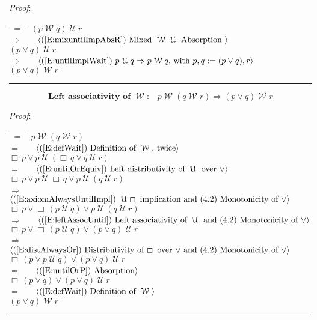 \documentclass[12pt, fleqn, leqno]{article}
\newcommand{\lgap}{2pt}                             %
\newcommand{\mymathindent}{24pt}                    %
\newcommand{\impl}{\ensuremath{\Rightarrow}}        %
\newcommand{\Until}{\;\mathcal{U}\;}
\newcommand{\Wait}{\;\mathcal{W}\;}
\newcommand{\Always}{\Box\,}
\newcommand{\myqed}{\rule[-.23ex]{1.2ex}{2.0ex}}
\newcommand{\myqedtab}{\hspace{384pt}}              %
\newcommand{\Gll} {\langle}                         %
\newcommand{\Ggg} {\rangle}                         %
\newcommand{\Hint}[1]     {\ \ \ $\Gll              \mbox{#1} \Ggg$ }   %
\begin{document}
\emph{Proof}: 
\begin{tabbing}
\hspace{\mymathindent} \= $= \;$ \= \myqedtab \= \kill
  \> \>   $(p\Wait q)\Until r$\\[\lgap]
  \> $\impl$  \>  \Hint{(\ref{E:mixuntilImpAbsR}) Mixed $\Wait\Until$ Absorption }\\[\lgap]
  \> \>   $(p \lor q) \Until r$\\[\lgap]
  \> $\impl$  \>  \Hint{(\ref{E:untilImplWait}) $p\Until q\impl p\Wait q$, with $p,q := (p\lor q), r$}\\[\lgap]
  \> \>   $(p \lor q) \Wait r$ \quad \myqed
\end{tabbing}

\begin{equation}\label{E:leftAssocWait}
\textbf{Left associativity of $\Wait$:}\quad p \Wait (q \Wait r) \impl (p \lor q) \Wait r
\end{equation}

\emph{Proof}:
\begin{tabbing}
\hspace{\mymathindent} \= $= \;$ \= \myqedtab \= \kill
\> \>   $p \Wait (q \Wait r)$\\[\lgap]
\> $=$ \> \Hint{(\ref{E:defWait}) Definition of $\Wait$, twice} \\[\lgap]
\> \>   $\Always p\lor p\Until (\Always q\lor q \Until r)$\\[\lgap]
\> $=$  \>  \Hint{(\ref{E:untilOrEquiv}) Left distributivity of $\Until$ over $\lor$}\\[\lgap]
\> \>   $\Always p\lor p\Until \Always q\lor p\Until (q \Until r)$\\[\lgap]
\> $\impl$ \> \Hint{(\ref{E:axiomAlwaysUntilImpl}) $\Until\Always$ implication and (4.2) Monotonicity of $\lor$}\\[\lgap]
\> \>   $\Always p\lor \Always (p\Until q)\lor p\Until (q \Until r)$\\[\lgap]
\> $\impl$ \> \Hint{(\ref{E:leftAssocUntil}) Left associativity of $\Until$ and (4.2) Monotonicity of $\lor$} \\[\lgap]
\> \>   $\Always p\lor \Always (p\Until q)\lor (p\lor q) \Until r$\\[\lgap]
  \> $\impl$  \>  \Hint{(\ref{E:distAlwaysOr}) Distributivity of $\Always$ over $\lor$ and (4.2) Monotonicity of $\lor$}\\[\lgap]
\> \>   $\Always (p\lor p\Until q)\lor (p\lor q) \Until r$\\[\lgap]
\> $=$ \> \Hint{(\ref{E:untilOrP}) Absorption} \\[\lgap]
\> \>   $\Always (p\lor q)\lor (p\lor q) \Until r$\\[\lgap]
\> $=$ \> \Hint{(\ref{E:defWait}) Definition of $\Wait$} \\[\lgap]
\> \>   $(p\lor q) \Wait r$ \quad \myqed
\end{tabbing}
\end{document}
